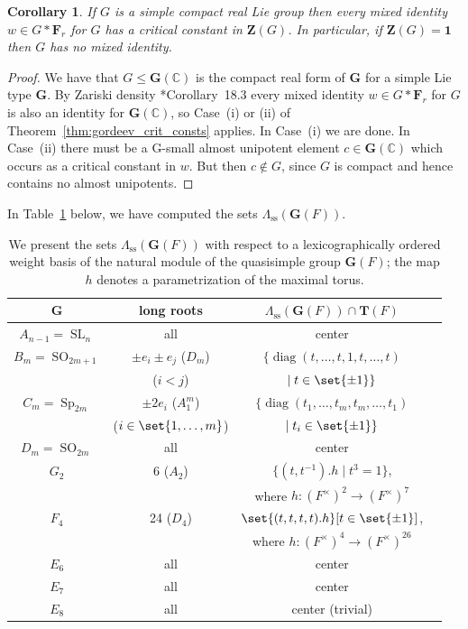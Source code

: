 \documentclass[a4paper,12pt]{amsproc}
\DeclareMathOperator{\SO}{SO}%
\DeclareMathOperator{\Sp}{Sp}%
\DeclareMathOperator{\SL}{SL}%
\DeclareMathOperator{\diag}{diag}
\theoremstyle{plain}
\newtheorem{corollary}[definition]{Corollary}
\theoremstyle{definition}
\begin{document}
\begin{corollary}\label{cor:comp_lie_grps} If $G$ is a simple compact real Lie group then every mixed identity 
$w\in G\ast\mathbf{F}_r$ for $G$ has a critical constant in $\mathbf{Z}(G)$. 
In particular, if $\mathbf{Z}(G)=\mathbf{1}$ then $G$ has no mixed identity.
\end{corollary}

\begin{proof}
We have that $G\leq\mathbf{G}(\mathbb{C})$ is the compact real form of $\mathbf{G}$ 
for a simple Lie type $\mathbf{G}$. By Zariski density \cite{borel2012linear}*{Corollary~18.3} every mixed identity $w\in G\ast\mathbf{F}_r$ for $G$ is also an identity for $\mathbf{G}(\mathbb{C})$, 
so Case~(i) or (ii) of Theorem~\ref{thm:gordeev_crit_consts} applies. In Case~(i) we are done. In Case~(ii) there must be a G-small almost unipotent element $c\in\mathbf{G}(\mathbb{C})$ which occurs as a critical constant in $w$. But then $c\notin G$, since $G$ is compact and hence contains no almost unipotents.
\end{proof}
	
In Table~\ref{tab:small-elements} below, we have computed the sets $\Lambda_{\text{ss}}(\mathbf{G}(F))$.
	
\begin{table}[htb]
\centering
\begin{tabular}{|c|c|c|c|}
\hline
$\mathbf{G}$ & long roots & $\Lambda_{\text{ss}}(\mathbf{G}(F))\cap\mathbf{T}(F)$ \\
\hline
$A_{n-1}=\SL_n$ & all & center\\
\hline
$B_m=\SO_{2m+1}$ & $\pm e_i \pm e_j$ ($D_m$) & $\{\diag(t,\ldots,t,1,t,\ldots,t)$\\ & ($i<j$) & $\mid t\in\set{\pm1}\}$\\
\hline
$C_m=\Sp_{2m}$ & $\pm 2e_i$ ($A_1^m$)& $\{\diag(t_1,\ldots,t_m,t_m,\ldots,t_1)$ \\ & ($i\in\set{1,\ldots,m}$) & $\mid t_i\in\set{\pm1}\}$\\
\hline
$D_m=\SO_{2m}$ & all & center\\
\hline
$G_2$ & 6 ($A_2$) & 
$\{(t,t^{-1}).h\mid t^3=1\}$,\\
& & where $h\colon (F^\times)^2\to (F^\times)^7$\\
\hline
$F_4$ & 24 ($D_4$) & $\set{(t,t,t,t).h}[t\in\set{\pm1}]$,\\
& & where $h\colon (F^\times)^4\to(F^\times)^{26}$\\
\hline
$E_6$ & all & center\\
\hline
$E_7$ & all & center\\
\hline
$E_8$ & all & center (trivial)\\
\hline
\end{tabular}
\caption{We present the sets $\Lambda_{\text{ss}}(\mathbf{G}(F))$ with respect to a lexicographically ordered weight basis of the natural module of the quasisimple group $\mathbf{G}(F)$; the map $h$ denotes a parametrization of the maximal torus.}
\label{tab:small-elements}
\end{table}
\end{document}
